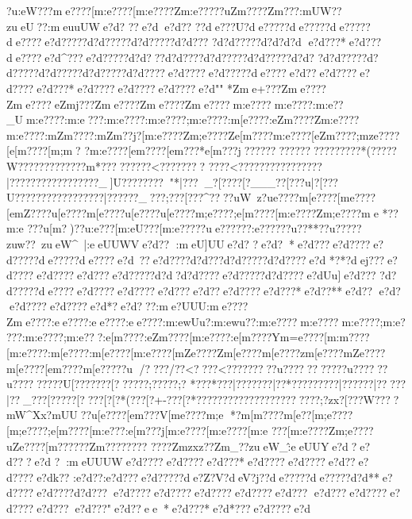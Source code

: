 {{{{{{{{{{{{{{{{{{{{{{{{{{{{{{{{{{{{{{{{{{{{{{{{{{{{{{{{{{{{{{{{{{{{{{{{{{{{{{{{{{{{{{{{{{{{{{{{{{{{{{{{{{{{{{{{{{{{{{{{{{{{{{{{{{{{{{{{{{{{{{{{{{{{{{{{{{{{{{{{{{{{{{{{{{{{{{{{{{{{{{{{{{{{{{{{{{{{{{{{{{{{{{{{{{{{{{{{{{{{{{{{{{{{{{{{{{{{{{{{{{{{{{{{{{{{{{{{{{{{{{{{{{{{{{{{{{{{{{{{{{{{{{{{{{{{{{{{{{{{{{{{{{{{{{{{{{{{{{{{{{{{{{{{{{{{{{{{{{{{{{{{{{{{{{{{{{{{{{{{{{{{{{{{{{{{{{{{{{{{{{{{{{{{{{{{{{{{{{{{{{{{{{{{{{{{{{{{{{{{{{{{{{{{{{{{{{{{{{{{{{{{{{{{{{{{{{{{{{{{{{{{{{{{{{{{{{{{?u:eW???{me????[m:e????[m:e????Zm:e?????uZm????}Zm???}:mUW??zueU??:meuuUWe?d? ??e?d   e?d?? ??de???U?de?????de?????de?????de????e?d?????d?d?????d?d?????d?d???
?d?d?????d?d    ?d?d    e?d???*e?d???de????e?d^???e?d?????d?d? ??d?d????d?d?????d?d?????d?d?   ?d?d?????d?d?????d?d?????d?d?????d?d????e?d????e?d?????de????e?d??e?d????e?d????e?d???*e?d????e?d????e?d????e?d"" *Zme+???Zme????Zme????eZmj???Zme????Zme????Zme????m:e????m:e????:m:e??_Um:e????:m:e???:m:e????:m:e????;m:e????:m[e????:eZm????Zm:e????{m:e????:mZm????:mZm??j?[m:e????Zm;e????Ze[m????{m:e????[eZm????;mze????[e[m????[m;m? ?{m:e????[e{m????[e{m???*{e[m???j??}??????}??????}???????*(?????}W??????}???????m*?????}????<???????\??
???{?<?????{?\???????\?????|?????????{???????{?_]U{?{?????{?{?"*|?{??_{?[??? {?[?___?{?[???}u|?[???U??{???????????????|?????{?_??{?;???[???^????uW~z?u{e????{m[e????[m{e????[e{mZ????u[e????{m[e????u[e????{u[e????{m;e????;e[m????[m:e????Zm;e????{me
*??{m:e
???u[m?)??u:e???[m:eU???[m:e?????ue??????:e??????u??**??u?????zuw??~zueW^~|:eeUUWVe?d?? :meU]UUe?d?  ?e?d?*e?d???e?d????e?d?????de?????de????e?d~??e?d????d?d??  ?d?d?????d?d????e?d
*?*?dej???e?d????e?d????e?d??? e?d?????d?d   ?d?d????e?d?????d?d????e?dUu]}e?d???
?d?d?????de????e?d????e?d????e?d??}?e?d??e?d????e?d???*e?d??**e?d??  e?d?
  e?d????e?d????e?d*  ?e?d???:me?UUU:me????Zme????:ee????:ee????:ee????:m:ewUu?:m:ewu??:m:e????m:e????m:e????;m:e????:m:e????;m:e???:e[m????:eZm????[m:e????:e[m????Ym=e????[m:m????[m:e????:m[e????:m[e????[m:e????[mZe????Zm[e????{m[e????zm[e????{mZe????{m[e????[e{m????{m[e????}?u
/???}?/??<????<?????????u??????}????}?u??????u??????}???U[???????[??????\?;?????\?;?
*??{?\?*???|?{?????{?|??*??{???????|?{?????|?{????|?{?_??{?[????{?[????[?[?*(??{?[?+-???[?*?????{???????????  ??{????{?;?zx?[???W????{mW^Xx?}{mUU??u[e????[e{m???V[m{e????{m;e
*?{m[m????{m[e??[m;e????[m;e????;e[m????[m:e???:e[m???j[m:e????[m:e????[m:e
???[m:e????Zm;e????{uZe????}[m??????Zm???????}?
????Zmzxz??}Zm_{??zueW_\^:eeUU}Ye?d  ?e?d???e?d
?:meUUUWe?d????e?d????e?d???*e?d????e?d????e?d??e?d????e?dk??
:e?d??:e?d???e?d?????de?Z?V?deV?j??de?????de?????d?d**  e?d????e?d????d?d???e?d????e?d????e?d????e?d????e?d???
e?d??? e?d????e?d????e?d???e?d???"e?d??ee *e?d???*e?d*???e?d????e?d
}}}}}}}}}}}}}}}}}}}}}}}}}}}}}}}}}}}}}}}}}}}}}}}}}}}}}}}}}}}}}}}}}}}}}}}}}}}}}}}}}}}}}}}}}}}}}}}}}}}}}}}}}}}}}}}}}}}}}}}}}}}}}}}}}}}}}}}}}}}}}}}}}}}}}}}}}}}}}}}}}}}}}}}}}}}}}}}}}}}}}}}}}}}}}}}}}}}}}}}}}}}}}}}}}}}}}}}}}}}}}}}}}}}}}}}}}}}}}}}}}}}}}}}}}}}}}}}}}}}}}}}}}}}}}}}}}}}}}}}}}}}}}}}}}}}}}}}}}}}}}}}}}}}}}}}}}}}}}}}}}}}}}}}}}}}}}}}}}}}}}}}}}}}}}}}}}}}}}}}}}}}}}}}}}}}}}}}}}}}}}}}}}}}}}}}}}}}}}}}}}}}}}}}}}}}}}}}}}}}}}}}}}}}}}}}}}}}}}}}}}}}}}}}}}}}}}}}}}}}}}}}}}}}}}}}}}}}}}}}}}}}}}}}}}}}}}}}}}}}}}}}}}}}}}}}}}
